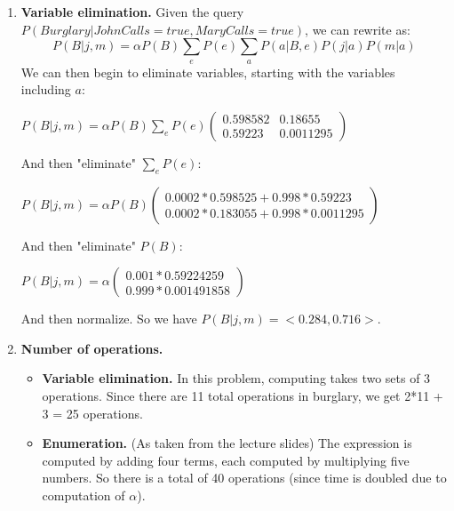 \documentclass[12pt]{article}
\begin{document}
\begin{enumerate}[label=(\alph*)]
    \item \textbf{Variable elimination.} Given the query $P(Burglary | JohnCalls = true, MaryCalls = true)$, we can rewrite as:
    \begin{equation}
        P(B | j, m) = \alpha P(B) \sum_e P(e) \sum_a P(a | B,e)P(j|a)P(m|a)
    \end{equation} 
    We can then begin to eliminate variables, starting with the variables including $a$: 
    
    \begin{center}
        $ P(B | j,m) = \alpha P(B) \sum_e P(e)
        \begin{pmatrix}
             0.598582 & 0.18655\\
             0.59223 & 0.0011295
        \end{pmatrix}$
    \end{center}
        
    And then "eliminate" $\sum_e P(e)$:
    \begin{center}
        $ P(B | j,m) = \alpha P(B) 
        \begin{pmatrix}
             0.0002 * 0.598525 + 0.998 * 0.59223\\
             0.0002 * 0.183055 + 0.998 * 0.0011295
        \end{pmatrix}$
    \end{center}
    
    And then "eliminate" $P(B)$:

    \begin{center}
        $P(B | j,m) = \alpha
        \begin{pmatrix}
             0.001 * 0.59224259 \\
             0.999 * 0.001491858
        \end{pmatrix} $
    \end{center}

    And then normalize. So we have $P(B | j,m) = <0.284, 0.716>$.
    
    \item \textbf{Number of operations.}
        \begin{itemize}
            \item \textbf{Variable elimination.} In this problem, computing takes two sets of 3 operations. Since there are 11 total operations in burglary, we get 2*11 + 3 = 25 operations.
            \item \textbf{Enumeration.} (As taken from the lecture slides) The expression is computed by adding four terms, each computed by multiplying five numbers. So there is a total of 40 operations (since time is doubled due to computation of $\alpha$).
        \end{itemize}
        

\end{enumerate}
\end{document}
